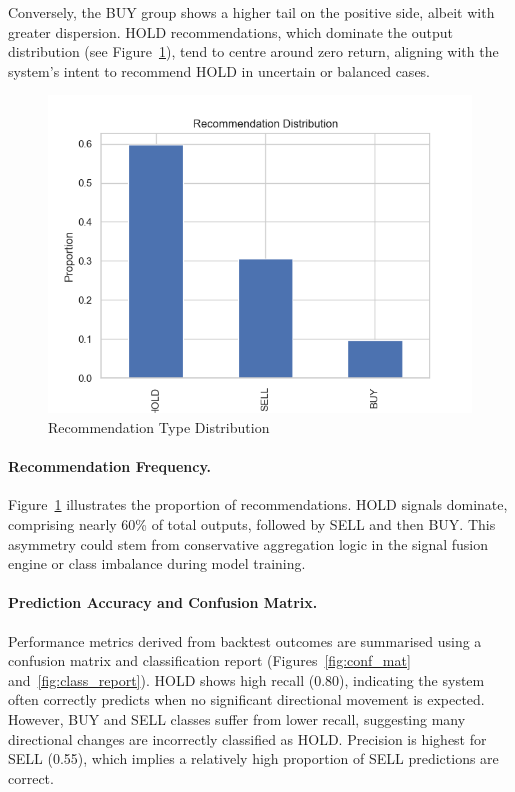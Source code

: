 \FloatBarrier

Conversely, the BUY group shows a higher tail on the positive side, albeit with greater dispersion. HOLD recommendations, which dominate the output distribution (see Figure~\ref{fig:rec_dist}), tend to centre around zero return, aligning with the system's intent to recommend HOLD in uncertain or balanced cases.

\begin{figure}[h]
  \centering
  \includegraphics[width=0.6\linewidth]{assets/recommendation_distribution.png}
  \caption{Recommendation Type Distribution}
  \label{fig:rec_dist}
\end{figure}

\paragraph{Recommendation Frequency.}  
Figure~\ref{fig:rec_dist} illustrates the proportion of recommendations. HOLD signals dominate, comprising nearly 60\% of total outputs, followed by SELL and then BUY. This asymmetry could stem from conservative aggregation logic in the signal fusion engine or class imbalance during model training.

\paragraph{Prediction Accuracy and Confusion Matrix.}  
Performance metrics derived from backtest outcomes are summarised using a confusion matrix and classification report (Figures~\ref{fig:conf_mat} and~\ref{fig:class_report}). HOLD shows high recall (0.80), indicating the system often correctly predicts when no significant directional movement is expected. However, BUY and SELL classes suffer from lower recall, suggesting many directional changes are incorrectly classified as HOLD. Precision is highest for SELL (0.55), which implies a relatively high proportion of SELL predictions are correct.

